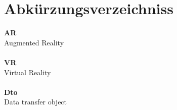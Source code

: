 \section*{Abkürzungsverzeichniss}
\label{sec:abbrev}
  \textbf{AR}\\
  Augmented Reality\\~\\
  \textbf{VR}\\
  Virtual Reality\\~\\
  \textbf{Dto}\\
  Data transfer object\\~\\
